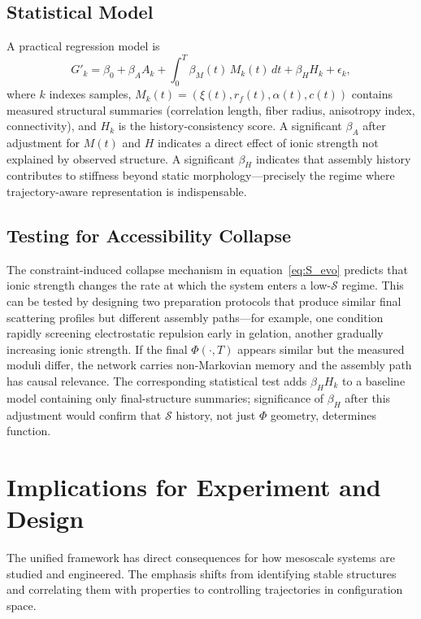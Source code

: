 \documentclass[11pt, a4paper, twocolumn]{article}
\newcommand{\Sfield}{\mathcal{S}}
\begin{document}
\subsection{Statistical Model}

A practical regression model is
\[
    G'_k
    =
    \beta_0
    +
    \beta_A A_k
    +
    \int_0^T
    \beta_M(t)\,M_k(t)\,dt
    +
    \beta_H H_k
    +
    \epsilon_k,
\]
where $k$ indexes samples, $M_k(t) = (\xi(t), r_f(t), \alpha(t), c(t))$
contains measured structural summaries (correlation length, fiber radius,
anisotropy index, connectivity), and $H_k$ is the history-consistency score.
A significant $\beta_A$ after adjustment for $M(t)$ and $H$ indicates a
direct effect of ionic strength not explained by observed structure. A
significant $\beta_H$ indicates that assembly history contributes to stiffness
beyond static morphology---precisely the regime where trajectory-aware
representation is indispensable.

\subsection{Testing for Accessibility Collapse}

The constraint-induced collapse mechanism in equation~\eqref{eq:S_evo} predicts
that ionic strength changes the rate at which the system enters a low-$\Sfield$
regime. This can be tested by designing two preparation protocols that produce
similar final scattering profiles but different assembly paths---for example,
one condition rapidly screening electrostatic repulsion early in gelation, another
gradually increasing ionic strength. If the final $\Phi(\cdot,T)$ appears similar
but the measured moduli differ, the network carries non-Markovian memory and
the assembly path has causal relevance. The corresponding statistical test adds
$\beta_H H_k$ to a baseline model containing only final-structure summaries;
significance of $\beta_H$ after this adjustment would confirm that $\Sfield$
history, not just $\Phi$ geometry, determines function.

\section{Implications for Experiment and Design}

The unified framework has direct consequences for how mesoscale systems are
studied and engineered. The emphasis shifts from identifying stable structures
and correlating them with properties to controlling trajectories in
configuration space.
\end{document}
